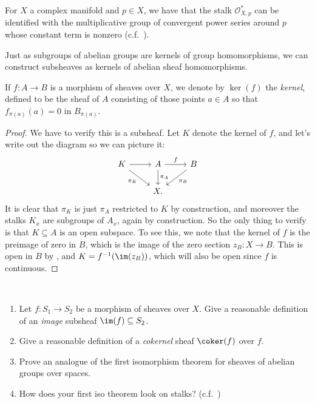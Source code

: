 \documentclass[11pt]{amsart}
\begin{document}
\begin{example} For $X$ a complex manifold and $p \in X$, we have that the stalk $\mathcal{O}_{X,p}^\ast$ can be identified with the multiplicative group of convergent power series around $p$ whose constant term is nonzero (c.f.~).
\end{example}



Just as subgroups of abelian groups are kernels of group homomorphisms, we can construct subsheaves as kernels of abelian sheaf homomorphisms.

\begin{proposition} If $f \colon A \to B$ is a morphism of sheaves over $X$, we denote by $\ker(f)$ the \emph{kernel}, defined to be the sheaf of $A$ consisting of those points $a\in A$ so that  $f_{\pi(a)}(a) = 0$ in $B_{\pi(a)}$.
\end{proposition}
\begin{proof} We have to verify this is a subsheaf. Let $K$ denote the kernel of $f$, and let's write out the diagram so we can picture it:
\[ \begin{tikzcd}
    K\ar[dr,"\pi_K" below left]\rar & A\dar["\pi_A"]\rar["f"] & B\ar[dl,"\pi_B"]\\
     & X. & 
\end{tikzcd} \]
It is clear that $\pi_K$ is just $\pi_A$ restricted to $K$ by construction, and moreover the stalks $K_x$ are subgroups of $A_x$, again by construction. So the only thing to verify is that $K \subseteq A$ is an open subspace. To see this, we note that the kernel of $f$ is the preimage of zero in $B$, which is the image of the zero section $z_B \colon X \to B$. This is open in $B$ by , and $K = f^{-1}(\im(z_B))$, which will also be open since $f$ is continuous.
\end{proof}

\begin{exercise} \,
\begin{enumerate}
    \item Let $f \colon S_1 \to S_2$ be a morphism of sheaves over $X$. Give a reasonable definition of an \emph{image} subsheaf $\im(f) \subseteq S_2$.
    \item Give a reasonable definition of a \emph{cokernel} sheaf $\coker(f)$ over $f$.
    \item Prove an analogue of the first isomorphism theorem for sheaves of abelian groups over spaces.
    \item How does your first iso theorem look on stalks? (c.f.~)
\end{enumerate}
\end{exercise}
\end{document}
